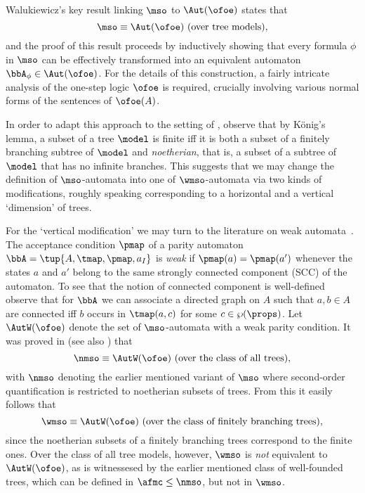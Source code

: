 Walukiewicz's key result linking $\mso$ to $\Aut(\ofoe)$ states that
\begin{equation}
\mso \equiv \Aut(\ofoe)
 \text{ (over tree models)},
\end{equation}
and the proof of this result proceeds by inductively showing that every formula
$\phi$ in $\mso$ can be effectively transformed into an equivalent
automaton $\bbA_{\phi} \in \Aut(\ofoe)$.
For the details of this construction, a fairly intricate analysis of the
one-step logic $\ofoe$ is required, crucially involving various normal
forms of the sentences of $\ofoe(A)$.

In order to adapt this approach to the setting of \wmso, observe that by
K\"onig's lemma, a subset of a tree $\model$ is finite iff it is both a subset of
a finitely branching subtree of $\model$ and \emph{noetherian}, that is, a subset
of a subtree of $\model$ that has no infinite branches.
This suggests that we may change the definition of $\mso$-automata into one
of $\wmso$-automata via two kinds of modifications, roughly speaking
corresponding to a horizontal and a vertical `dimension' of trees.

For the `vertical modification' we may turn to the literature on weak automata~\cite{MullerSaoudiSchupp92}.
The acceptance condition $\pmap$ of a parity automaton $\bbA =
\tup{A, \tmap, \pmap, a_I}$ is \emph{weak} if $\pmap(a) = \pmap(a')$ whenever
the states $a$ and $a'$ belong to the same strongly connected component
(SCC) of the automaton. To see that the notion of connected component is well-defined
observe that for $\bbA$ we can associate a directed graph on $A$
such that $a,b \in A$ are connected iff $b$ occurs in $\tmap(a,c)$ for some $c \in \wp(\props)$.
%
Let $\AutW(\ofoe)$ denote the set of $\mso$-automata with a weak parity
condition.
It was proved in \cite{Zanasi:Thesis:2012} (see also \cite{DBLP:conf/lics/FacchiniVZ13}) that
\begin{equation*}
\nmso \equiv \AutW(\ofoe) \text{ (over the class of all trees)},
\end{equation*}
with $\nmso$ denoting the earlier mentioned variant of $\mso$ %
where second-order quantification is restricted to noetherian subsets of trees.
From this it easily follows that
\begin{equation*}
\wmso \equiv \AutW(\ofoe) \text{ (over the class of finitely
branching trees)},
\end{equation*}
since the noetherian subsets of a finitely branching trees correspond to the
finite ones.
Over the class of all tree models, however, $\wmso$ is \emph{not} equivalent
to $\AutW(\ofoe)$, %
as is witnessesed by the earlier mentioned
class of well-founded trees, which can be defined in $\afmc \leq \nmso$,
but not in $\wmso$.

